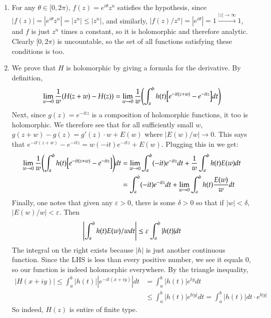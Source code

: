 \documentclass[12pt]{article}
\def \ve{\varepsilon}
\theoremstyle{definition}
\theoremstyle{remark}
\begin{document}
\begin{enumerate}[leftmargin=\labelsep]
		\item For any $\theta \in [0, 2\pi)$, $f(z) = e^{i\theta}z^n$ satisfies the hypothesis, since
		$|f(z)| = |e^{i\theta}z^n| = |z^n| \leq |z^n|$, and similarly, $|f(z)/z^n| = |e^{i\theta}| = 1 \overset{|z| \to \infty}{\to} 1$, and $f$ is just $z^n$ times a constant, so it is holomorphic and therefore analytic. Clearly $[0, 2\pi)$ is uncountable, so the set of all functions satisfying these conditions is too.
		
		\item We prove that $H$ is holomorphic by giving a formula for the derivative. By definition,
		\begin{align*}
			\lim_{w \to 0} \frac 1w (H(z+w)-H(z)) = \lim_{w \to 0} \frac 1w \qty(\int_a^b h(t)\qty[e^{-it(z+w)}-e^{-itz}]dt)
		\end{align*}
		Next, since $g(z) = e^{-itz}$ is a composition of holomorphic functions, it too is holomorphic. We therefore see that for all sufficiently small $w$, $g(z+w) - g(z) = g'(z) \cdot w + E(w)$ where $|E(w)/w| \to 0$. This says that $e^{-it(z+w)} - e^{-itz} = w(-it)e^{-itz} + E(w)$. Plugging this in we get:
		\begin{align*}
			\lim_{w \to 0} \frac 1w \qty(\int_a^b h(t)\qty[e^{-it(z+w)}-e^{-itz}])dt &= \lim_{w \to 0} \int_a^b (-it)e^{-itz}dt + \frac 1w \int_a^b h(t)E(w)dt \\
			&= \int_a^b (-it)e^{-itz}dt + \lim_{w \to 0} \int_a^b h(t)\frac{E(w)}{w}dt
		\end{align*}
		Finally, one notes that given any $\ve > 0$, there is some $\delta > 0$ so that if $|w| < \delta$, $|E(w)/w| < \ve$. Then
		\begin{align*}
			\qty|\int_a^b h(t)E(w)/wdt| \leq \ve \int_a^b |h(t)|dt
		\end{align*}
		The integral on the right exists because $|h|$ is just another continuous function. Since the LHS is less than every positive number, we see it equals 0, so our function is indeed holomorphic everywhere. By the triangle inequality,
		\begin{align*}
			|H(x+iy)| \leq \int_a^b |h(t)||e^{-it(x+iy)}|dt &= \int_a^b |h(t)|e^{ty}dt \\
			&\leq \int_a^b |h(t)| e^{b|y|}dt = \int_a^b |h(t)|dt \cdot e^{b|y|}
		\end{align*}
		So indeed, $H(z)$ is entire of finite type.
		

\end{enumerate}
\end{document}
